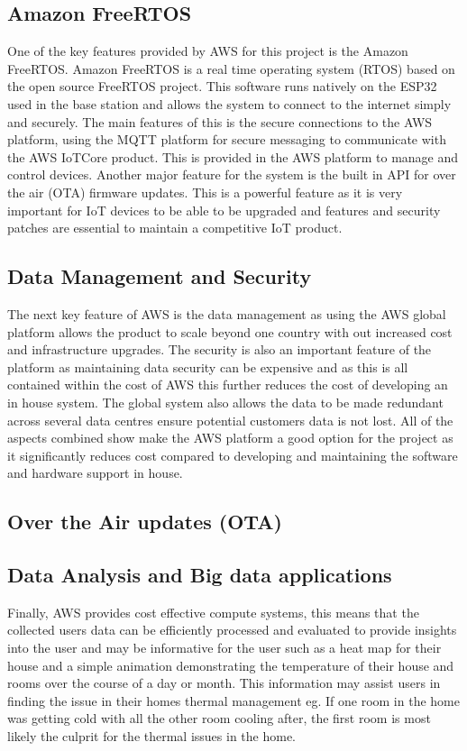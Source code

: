 \documentclass{article}
\begin{document}
\subsection{Amazon FreeRTOS}
One of the key features provided by AWS for this project is the Amazon FreeRTOS. Amazon FreeRTOS
is a real time operating system (RTOS) based on the open source FreeRTOS project. This software
runs natively on the ESP32 used in the base station and allows the system to connect to the
internet simply and securely. The main features of this is the secure connections to the AWS
platform, using the MQTT platform for secure messaging to communicate with the AWS IoTCore
product. This is provided in the AWS platform to manage and control devices. Another major feature
for the system is the built in API for over the air (OTA) firmware updates. This is a powerful
feature as it is very important for IoT devices to be able to be upgraded and features and
security patches are essential to maintain a competitive IoT product.

\subsection{Data Management and Security}
The next key feature of AWS is the data management as using the AWS global platform allows the
product to scale beyond one country with out increased cost and infrastructure upgrades. The
security is also an important feature of the platform as maintaining data security can be
expensive and as this is all contained within the cost of AWS this further reduces the cost of
developing an in house system. The global system also allows the data to be made redundant across
several data centres ensure potential customers data is not lost. All of the aspects combined show
make the AWS platform a good option for the project as it significantly reduces cost compared to
developing and maintaining the software and hardware support in house.

\subsection{Over the Air updates (OTA)}

\subsection{Data Analysis and Big data applications}
Finally, AWS provides cost effective compute systems, this means that the collected users data can
be efficiently processed and evaluated to provide insights into the user and may be informative
for the user such as a heat map for their house and a simple animation demonstrating the
temperature of their house and rooms over the course of a day or month. This information may
assist users in finding the issue in their homes thermal management eg. If one room in the home
was getting cold with all the other room cooling after, the first room is most likely the culprit
for the thermal issues in the home.
\end{document}
